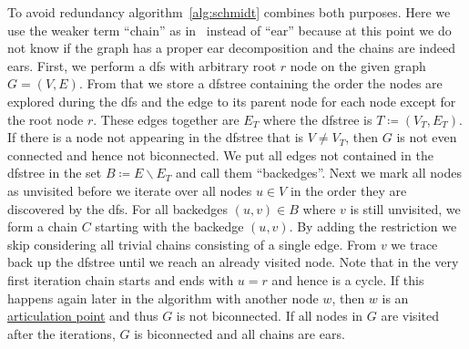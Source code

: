 To avoid redundancy algorithm~\ref{alg:schmidt} combines both purposes. Here we use the weaker term \enquote{chain} as in~\cite{schmidt2013} instead of \enquote{ear} because at this point we do not know if the graph has a proper ear decomposition and the chains are indeed ears.
First, we perform a \gls{dfs} with arbitrary root \(r\) node on the given graph \(G = (V, E)\). From that we store a \gls{dfstree} containing the order the nodes are explored during the \gls{dfs} and the edge to its parent node for each node except for the root node \(r\). These edges together are \(E_T\) where the \gls{dfstree} is \(T \coloneqq (V_T, E_T)\).
If there is a node not appearing in the \gls{dfstree} that is \(V \neq V_T\), then \(G\) is not even connected and hence not biconnected.
We put all edges not contained in the \gls{dfstree} in the set \(B \coloneqq E \backslash E_T\) and call them \enquote{backedges}. Next we mark all nodes as unvisited before we iterate over all nodes \(u \in V\) in the order they are discovered by the \gls{dfs}.
For all backedges \((u,v) \in B\) where \(v\) is still unvisited, we form a chain \(C\) starting with the backedge \((u,v)\). By adding the restriction we skip considering all trivial chains consisting of a single edge. From \(v\) we trace back up the \gls{dfstree} until we reach an already visited node. Note that in the very first iteration chain starts and ends with \(u = r\) and hence is a cycle.
If this happens again later in the algorithm with another node \(w\), then \(w\) is an \hyperref[def:articulation_point]{articulation point} and thus \(G\) is not biconnected. If all nodes in \(G\) are visited after the iterations, \(G\) is biconnected and all chains are ears.

